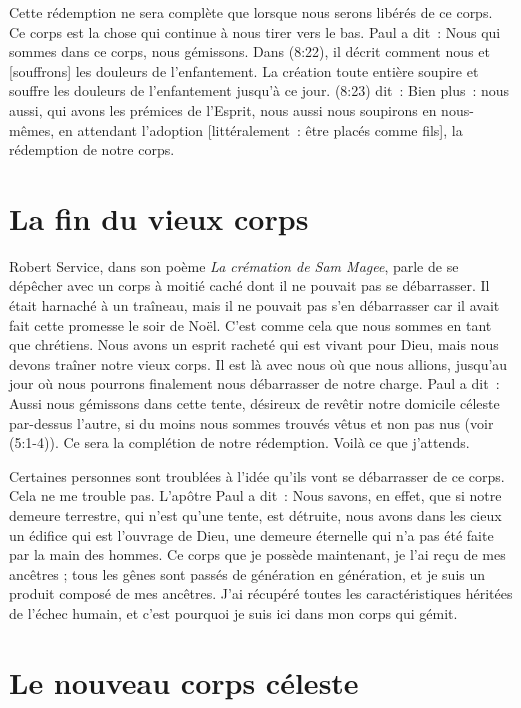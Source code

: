 Cette rédemption ne sera complète que lorsque nous serons libérés
 de ce corps.
 Ce corps est la chose qui continue à nous tirer vers le bas.
 Paul a dit~:
 \og Nous qui sommes dans ce corps, nous gémissons. \fg{}
 Dans (8:22), il décrit comment nous
 \og [soupirons] et [souffrons] les douleurs de l'enfantement. \fg{}
 La création toute entière soupire et souffre
 les douleurs de l'enfantement jusqu'à ce jour.
 (8:23) dit~:
 \og Bien plus~: nous aussi, qui avons les prémices de l'Esprit,
 nous aussi nous soupirons en nous-mêmes, en attendant l'adoption
 [littéralement~: être placés comme fils],
 la rédemption de notre corps. \fg{}


\section*{La fin du vieux corps}

Robert Service, dans son poème \emph{La crémation de Sam Magee},
 parle de se dépêcher \og avec un corps à moitié caché
 dont il ne pouvait pas se débarrasser. \fg{}
 Il était harnaché à un traîneau, mais il ne pouvait pas s'en débarrasser
 car il avait fait cette promesse le soir de Noël.
 C'est comme cela que nous sommes en tant que chrétiens.
 Nous avons un esprit racheté qui est vivant pour Dieu,
 mais nous devons traîner notre vieux corps.
 Il est là avec nous où que nous allions, jusqu'au jour où nous pourrons
 finalement nous débarrasser de notre charge. Paul a dit~:
 \og Aussi nous gémissons dans cette tente, désireux de revêtir
 notre domicile céleste par-dessus l'autre, si du moins nous sommes
 trouvés vêtus et non pas nus \fg{} (voir (5:1-4)).
 Ce sera la complétion de notre rédemption. Voilà ce que j'attends.

Certaines personnes sont troublées
 à l'idée qu'ils vont se débarrasser de ce corps. Cela ne me trouble pas.
 L'apôtre Paul a dit~:
 \og  Nous savons, en effet, que si notre demeure terrestre,
 qui n'est qu'une tente, est détruite, nous avons dans les cieux
 un édifice qui est l'ouvrage de Dieu, une demeure éternelle
 qui n'a pas été faite par la main des hommes. \fg{}
 Ce corps que je possède maintenant, je l'ai reçu de mes ancêtres ;
 tous les gênes sont passés de génération en génération,
 et je suis un produit composé de mes ancêtres.
 J'ai récupéré toutes les caractéristiques héritées de l'échec humain,
 et c'est pourquoi je suis ici dans mon corps qui gémit.


\section*{Le nouveau corps céleste}


